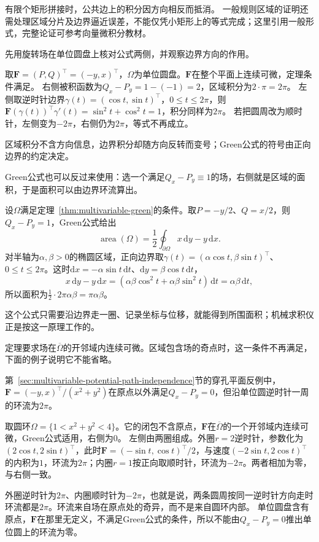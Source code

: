 有限个矩形拼接时，公共边上的积分因方向相反而抵消。
一般规则区域的证明还需处理区域分片及边界逼近误差，不能仅凭小矩形上的等式完成；这里引用一般形式，完整论证可参考向量微积分教材。

先用旋转场在单位圆盘上核对公式两侧，并观察边界方向的作用。
\begin{example}[旋转场在单位圆盘上的Green公式]
\label{ex:analysis-rotation-field-green-disk}
取$\bm F=(P,Q)^\top=(-y,x)^\top$，$\Omega$为单位圆盘。$\bm F$在整个平面上连续可微，定理条件满足。
右侧被积函数为$Q_x-P_y=1-(-1)=2$，区域积分为$2\cdot\pi=2\pi$。
左侧取逆时针边界$\gamma(t)=(\cos t,\sin t)^\top$，$0\leq t\leq2\pi$，则$\bm F(\gamma(t))^\top\gamma'(t)=\sin^2t+\cos^2t=1$，积分同样为$2\pi$。
若把圆周改为顺时针，左侧变为$-2\pi$，右侧仍为$2\pi$，等式不再成立。
\end{example}
区域积分不含方向信息，边界积分却随方向反转而变号；Green公式的符号由正向边界的约定决定。

Green公式也可以反过来使用：选一个满足$Q_x-P_y\equiv1$的场，右侧就是区域的面积，于是面积可以由边界环流算出。
\begin{example}[用边界计算面积]
\label{ex:analysis-green-area-formula}
设$\Omega$满足定理~\ref{thm:multivariable-green}的条件。取$P=-y/2$、$Q=x/2$，则$Q_x-P_y=1$，Green公式给出
\[
 \operatorname{area}(\Omega)=\frac12\oint_{\partial\Omega}x\,\mathrm dy-y\,\mathrm dx.
\]
对半轴为$\alpha,\beta>0$的椭圆区域，正向边界取$\gamma(t)=(\alpha\cos t,\beta\sin t)^\top$、$0\leq t\leq2\pi$。这时$\mathrm dx=-\alpha\sin t\,\mathrm dt$、$\mathrm dy=\beta\cos t\,\mathrm dt$，
\[
 x\,\mathrm dy-y\,\mathrm dx=(\alpha\beta\cos^2t+\alpha\beta\sin^2t)\,\mathrm dt=\alpha\beta\,\mathrm dt,
\]
所以面积为$\frac12\cdot2\pi\alpha\beta=\pi\alpha\beta$。
\end{example}
这个公式只需要沿边界走一圈、记录坐标与位移，就能得到所围面积；机械求积仪正是按这一原理工作的。

定理要求场在$\overline\Omega$的开邻域内连续可微。区域包含场的奇点时，这一条件不再满足，下面的例子说明它不能省略。
\begin{example}[有孔区域上的涡旋场]
\label{ex:analysis-annulus-vortex-green}
第~\ref{sec:multivariable-potential-path-independence}节的穿孔平面反例中，$\bm F=(-y,x)^\top/(x^2+y^2)$在原点以外满足$Q_x-P_y=0$，但沿单位圆逆时针一周的环流为$2\pi$。

取圆环$\Omega=\{1<x^2+y^2<4\}$。它的闭包不含原点，$\bm F$在$\overline\Omega$的一个开邻域内连续可微，Green公式适用，右侧为$0$。
左侧由两圈组成。外圈$r=2$逆时针，参数化为$(2\cos t,2\sin t)^\top$，此时$\bm F=(-\sin t,\cos t)^\top/2$，与速度$(-2\sin t,2\cos t)^\top$的内积为$1$，环流为$2\pi$；内圈$r=1$按正向取顺时针，环流为$-2\pi$。两者相加为零，与右侧一致。
\end{example}
外圈逆时针为$2\pi$、内圈顺时针为$-2\pi$，也就是说，两条圆周按同一逆时针方向走时环流都是$2\pi$。环流来自场在原点处的奇异，而不是来自圆环内部。
单位圆盘含有原点，$\bm F$在那里无定义，不满足Green公式的条件，所以不能由$Q_x-P_y=0$推出单位圆上的环流为零。

